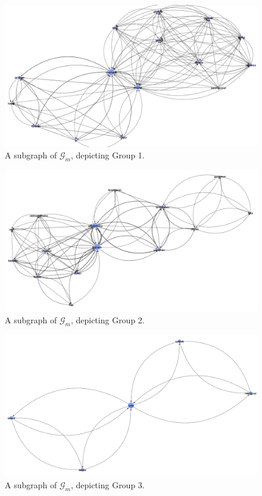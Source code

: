 \documentclass[11pt,a4paper]{book}
\theoremstyle{definition}
\theoremstyle{definition}
\theoremstyle{definition}
\theoremstyle{remark}
\newcommand{\acgraph}{\mathcal{G}_{m}}
\begin{document}
\begin{figure}
\includegraphics[width=\textwidth]{mgraph_group_1.png}
\caption{A subgraph of $\acgraph$, depicting Group 1.}
\label{fig:mgraph-community-1}
\end{figure}

\begin{figure}
\includegraphics[width=\textwidth]{mgraph_group_2.png}
\caption{A subgraph of $\acgraph$, depicting Group 2.}
\label{fig:mgraph-community-2}
\end{figure}

\begin{figure}
\includegraphics[width=\textwidth]{mgraph_group_3.png}
\caption{A subgraph of $\acgraph$, depicting Group 3.}
\label{fig:mgraph-community-3}
\end{figure}
\end{document}
